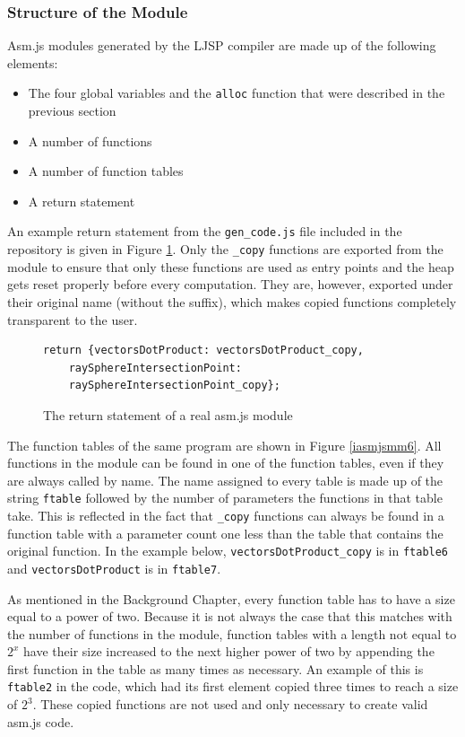 \documentclass[11pt]{report}
\begin{document}
\subsubsection{Structure of the Module}

Asm.js modules generated by the LJSP compiler are made up of the following elements:
\begin{itemize}
\item The four global variables and the \texttt{alloc} function that were described in the previous section
\item A number of functions
\item A number of function tables
\item A return statement
\end{itemize}

An example return statement from the \texttt{gen_code.js} file included in the repository is given in Figure \ref{iasmjsmm5}. Only the \texttt{_copy} functions are exported from the module to ensure that only these functions are used as entry points and the heap gets reset properly before every computation. They are, however, exported under their original name (without the suffix), which makes copied functions completely transparent to the user.

\begin{figure}[ht]
\begin{lstlisting}
return {vectorsDotProduct: vectorsDotProduct_copy, 
    raySphereIntersectionPoint: 
    raySphereIntersectionPoint_copy};
\end{lstlisting}
\caption{The return statement of a real asm.js module}
\label{iasmjsmm5}
\end{figure}

The function tables of the same program are shown in Figure \ref{iasmjsmm6}. All functions in the module can be found in one of the function tables, even if they are always called by name. The name assigned to every table is made up of the string \texttt{ftable} followed by the number of parameters the functions in that table take. This is reflected in the fact that \texttt{_copy} functions can always be found in a function table with a parameter count one less than the table that contains the original function. In the example below, \texttt{vectorsDotProduct_copy} is in \texttt{ftable6} and \texttt{vectorsDotProduct} is in \texttt{ftable7}.

As mentioned in the Background Chapter, every function table has to have a size equal to a power of two. Because it is not always the case that this matches with the number of functions in the module, function tables with a length not equal to $2^x$ have their size increased to the next higher power of two by appending the first function in the table as many times as necessary. An example of this is \texttt{ftable2} in the code, which had its first element copied three times to reach a size of $2^3$. These copied functions are not used and only necessary to create valid asm.js code.
\end{document}
